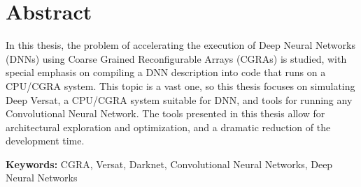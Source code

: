 
\section*{Abstract}


In this thesis, the problem of accelerating the execution of Deep Neural
Networks (DNNs) using Coarse Grained Reconfigurable Arrays (CGRAs) is studied,
with special emphasis on compiling a DNN description into code that runs on a
CPU/CGRA system. This topic is a vast one, so this thesis focuses on simulating
Deep Versat, a CPU/CGRA system suitable for DNN, and tools for running any
Convolutional Neural Network. The tools presented in this thesis allow for
architectural exploration and optimization, and a dramatic reduction of the
development time.


\vfill

\textbf{\Large Keywords:} CGRA, Versat, Darknet, Convolutional Neural Networks, Deep Neural Networks


